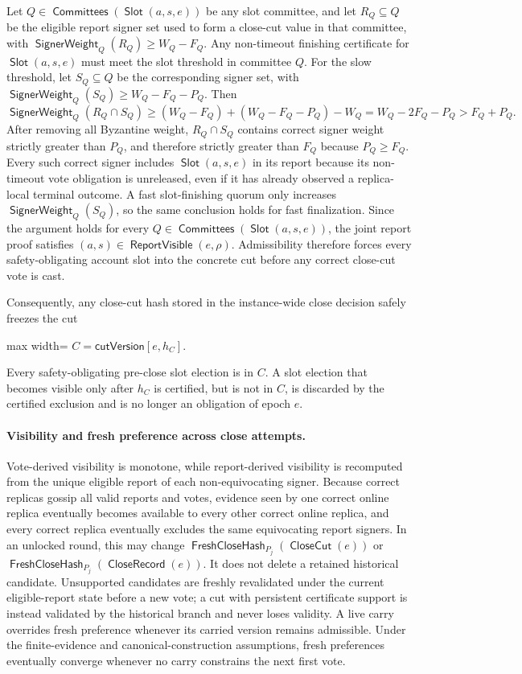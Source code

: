 \documentclass[sigplan,twocolumn,review,anonymous]{acmart}
\newcommand{\func}[1]{\operatorname{\mathsf{#1}}}
\newcommand{\Slot}{\func{Slot}}
\newcommand{\CloseCut}{\func{CloseCut}}
\newcommand{\CloseRecord}{\func{CloseRecord}}
\newcommand{\FreshCloseHash}{\func{FreshCloseHash}}
\newcommand{\Committees}{\func{Committees}}
\newcommand{\ReportVisible}{\func{ReportVisible}}
\newcommand{\cutVersion}{\mathsf{cutVersion}}
\newcommand{\SignerWeight}{\func{SignerWeight}}
\begin{document}
Let \(Q\in\Committees(\Slot(a,s,e))\) be any slot committee, and let \(R_Q\subseteq Q\) be the
eligible report signer set used to form a close-cut value in that committee, with
\(\SignerWeight_Q(R_Q)\ge W_Q-F_Q\).  Any non-timeout finishing certificate for
\(\Slot(a,s,e)\) must meet the slot threshold in committee \(Q\).  For the slow threshold, let
\(S_Q\subseteq Q\) be the corresponding signer set, with
\(\SignerWeight_Q(S_Q)\ge W_Q-F_Q-P_Q\).  Then
\[
\SignerWeight_Q(R_Q\cap S_Q)
\ge (W_Q-F_Q)+(W_Q-F_Q-P_Q)-W_Q
=W_Q-2F_Q-P_Q
>F_Q+P_Q.
\]
After removing all Byzantine weight, \(R_Q\cap S_Q\) contains correct signer weight strictly greater
than \(P_Q\), and therefore strictly greater than \(F_Q\) because \(P_Q\ge F_Q\).  Every such correct
signer includes \(\Slot(a,s,e)\) in its report because its
non-timeout vote obligation is unreleased, even if it has already observed a replica-local terminal
outcome.  A fast slot-finishing quorum only increases \(\SignerWeight_Q(S_Q)\), so the same conclusion
holds for fast finalization.  Since the argument holds for every
\(Q\in\Committees(\Slot(a,s,e))\), the joint report proof satisfies
\((a,s)\in\ReportVisible(e,\rho)\).  Admissibility therefore forces every safety-obligating account
slot into the concrete cut before any correct close-cut vote is cast.

Consequently, any close-cut hash stored in the instance-wide close decision safely freezes the cut
\begin{center}
\begin{adjustbox}{max width=\columnwidth}
\(\displaystyle
C=\cutVersion[e,h_C].
\)
\end{adjustbox}
\end{center}
Every safety-obligating pre-close slot election is in \(C\).  A slot election that becomes visible only
after \(h_C\) is certified, but is not in \(C\), is discarded by the certified exclusion and is no
longer an obligation of epoch \(e\).

\paragraph{Visibility and fresh preference across close attempts.}
Vote-derived visibility is monotone, while report-derived visibility is recomputed from the unique
eligible report of each non-equivocating signer.  Because correct replicas gossip all valid reports and
votes, evidence seen by one correct online replica eventually becomes available to every other correct
online replica, and every correct replica eventually excludes the same equivocating report signers.
In an unlocked round, this may change \(\FreshCloseHash_{P_j}(\CloseCut(e))\) or
\(\FreshCloseHash_{P_j}(\CloseRecord(e))\).  It does not delete a retained historical candidate.
Unsupported candidates are freshly revalidated under the current eligible-report state before a new
vote; a cut with persistent certificate support is instead validated by the historical branch and never
loses validity.  A live carry overrides fresh preference whenever its carried version remains admissible.  Under the
finite-evidence and canonical-construction assumptions,
fresh preferences eventually converge whenever no carry constrains the next first vote.
\end{document}

